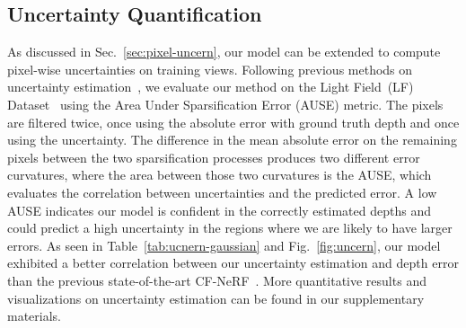 \subsection{Uncertainty Quantification}
\label{sec:exp_uncern}

As discussed in Sec.~\ref{sec:pixel-uncern}, our model can be extended to compute pixel-wise uncertainties on training views. 
Following previous methods on uncertainty estimation~\cite{CF-NeRF, shen2021snerf}, we evaluate our method on the Light Field~(LF) Dataset~\cite{lf-dataset} using the Area Under Sparsification Error (AUSE) metric. The pixels are filtered twice, once using the absolute error with ground truth depth and once using the uncertainty. The difference in the mean absolute error on the remaining pixels between the two sparsification processes produces two different error curvatures, where the area between those two curvatures is the AUSE, which evaluates the correlation between uncertainties and the predicted error. 
A low AUSE indicates our model is confident in the correctly estimated depths and could predict a high uncertainty in the regions where we are likely to have larger errors.
As seen in Table~\ref{tab:ucnern-gaussian} and Fig.~\ref{fig:uncern}, our model exhibited a better correlation between our uncertainty estimation and depth error than the previous state-of-the-art CF-NeRF~\cite{CF-NeRF}. More quantitative results and visualizations on uncertainty estimation can be found in our supplementary materials. 
